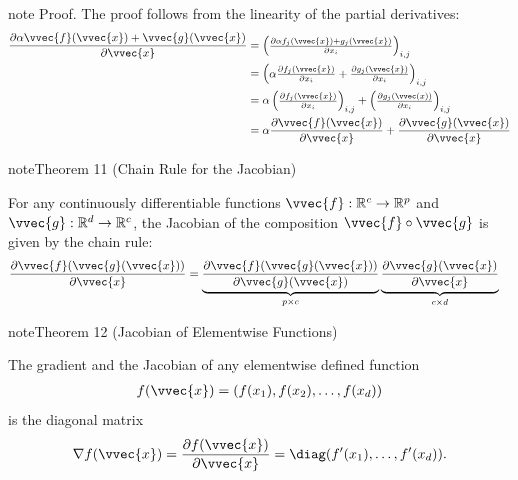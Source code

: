 \documentclass[letterpaper,10pt,english]{jupyterBook}
\begin{document}
\begin{sphinxadmonition}{note}
\sphinxAtStartPar
Proof. The proof follows from the linearity of the partial derivatives:
\begin{align*}
\frac{\partial \alpha\vvec{f}(\vvec{x})+\vvec{g}(\vvec{x})}{\partial \vvec{x}} &= \begin{pmatrix}\frac{\partial \alpha f_j(\vvec{x}) +g_j(\vvec{x})}{\partial x_i}\end{pmatrix}_{i,j}\\
&= \begin{pmatrix}\alpha\frac{\partial  f_j(\vvec{x})}{\partial x_i}+\frac{\partial g_j(\vvec{x})}{\partial x_i}\end{pmatrix}_{i,j}\\
&= \alpha\begin{pmatrix}\frac{\partial  f_j(\vvec{x})}{\partial x_i}\end{pmatrix}_{i,j} + \begin{pmatrix}\frac{\partial g_j(\vvec(x))}{\partial x_i}\end{pmatrix}_{i,j}\\
&=\alpha\frac{\partial\vvec{f}(\vvec{x})}{\partial\vvec{x}}+\frac{\partial\vvec{g}(\vvec{x})}{\partial\vvec{x}}
\end{align*}\end{sphinxadmonition}
\label{optimization_gradients:theorem-1}
\begin{sphinxadmonition}{note}{Theorem 11 (Chain Rule for the Jacobian)}



\sphinxAtStartPar
For any continuously differentiable functions \(\vvec{f}:\mathbb{R}^c\rightarrow \mathbb{R}^p\) and \(\vvec{g}:\mathbb{R}^d\rightarrow \mathbb{R}^c\), the Jacobian of the composition \(\vvec{f}\circ\vvec{g}\) is given by the chain rule:
\begin{align*}
        \frac{\partial \vvec{f}(\vvec{g}(\vvec{x}))}{\partial\vvec{x}}
        &= \underbrace{\frac{\partial \vvec{f}(\vvec{g}(\vvec{x}))}{\partial \vvec{g}(\vvec{x})}}_{p\times c}\underbrace{\frac{\partial \vvec{g}(\vvec{x})}{\partial \vvec{x}}}_{c\times d} 
    \end{align*}\end{sphinxadmonition}
\label{optimization_gradients:theorem-2}
\begin{sphinxadmonition}{note}{Theorem 12 (Jacobian of Element\sphinxhyphen{}wise Functions)}



\sphinxAtStartPar
The gradient and the Jacobian of any element\sphinxhyphen{}wise defined function
\begin{equation*}
\begin{split}f(\vvec{x}) = (f(x_1),f(x_2),\ldots,f(x_d))\end{split}
\end{equation*}
is the diagonal matrix
\begin{equation*}
\begin{split}\nabla f(\vvec{x}) = \frac{\partial f(\vvec{x})}{\partial \vvec{x}}=\diag(f'(x_1),\ldots, f'(x_d)).\end{split}
\end{equation*}
\end{sphinxadmonition}
\end{document}
